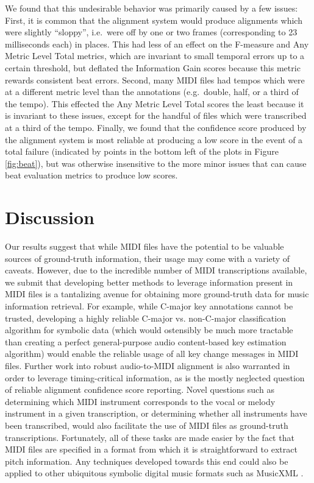 \documentclass{article}
\begin{document}
We found that this undesirable behavior was primarily caused by a few issues:
First, it is common that the alignment system would produce alignments which were slightly ``sloppy'', i.e.\ were off by one or two frames (corresponding to 23 milliseconds each) in places.
This had less of an effect on the F-measure and Any Metric Level Total metrics, which are invariant to small temporal errors up to a certain threshold, but deflated the Information Gain scores because this metric rewards consistent beat errors.
Second, many MIDI files had tempos which were at a different metric level than the annotations (e.g.\ double, half, or a third of the tempo).
This effected the Any Metric Level Total scores the least because it is invariant to these issues, except for the handful of files which were transcribed at a third of the tempo.
Finally, we found that the confidence score produced by the alignment system is most reliable at producing a low score in the event of a total failure (indicated by points in the bottom left of the plots in Figure \ref{fig:beat}), but was otherwise insensitive to the more minor issues that can cause beat evaluation metrics to produce low scores.

\section{Discussion}
\label{sec:discussion}

Our results suggest that while MIDI files have the potential to be valuable sources of ground-truth information, their usage may come with a variety of caveats.
However, due to the incredible number of MIDI transcriptions available, we submit that developing better methods to leverage information present in MIDI files is a tantalizing avenue for obtaining more ground-truth data for music information retrieval.
For example, while C-major key annotations cannot be trusted, developing a highly reliable C-major vs. non-C-major classification algorithm for symbolic data (which would ostensibly be much more tractable than creating a perfect general-purpose audio content-based key estimation algorithm) would enable the reliable usage of all key change messages in MIDI files.
Further work into robust audio-to-MIDI alignment is also warranted in order to leverage timing-critical information, as is the mostly neglected question of reliable alignment confidence score reporting.
Novel questions such as determining which MIDI instrument corresponds to the vocal or melody instrument in a given transcription, or determining whether all instruments have been transcribed, would also facilitate the use of MIDI files as ground-truth transcriptions.
Fortunately, all of these tasks are made easier by the fact that MIDI files are specified in a format from which it is straightforward to extract pitch information.
Any techniques developed towards this end could also be applied to other ubiquitous symbolic digital music formats such as MusicXML \cite{good2001musicxml}.
\end{document}
